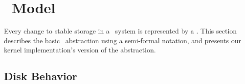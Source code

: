 
\section{\Patch\ Model}
\label{sec:patch}

\makeatletter
\let\emptyset\varnothing
\newcommand{\PBlock}[1]{\ensuremath{B_{#1}}}
\newcommand{\PSetlim}[1]{\def\@next{#1}\ifx\@next\@empty\else_{\@next}\fi}
\newcommand{\PMem}[1][]{\ensuremath{\mathcal{U}\PSetlim{#1}}}
\newcommand{\PInf}[1][]{\ensuremath{\mathcal{F}\PSetlim{#1}}}
\newcommand{\PDisk}[1][]{\ensuremath{\mathcal{C}\PSetlim{#1}}}
\newcommand{\PHard}[1][]{\ensuremath{\textit{\Nrb}\PSetlim{#1}}}
\newcommand{\PSoft}[1][]{\ensuremath{\textit{\Rb}\PSetlim{#1}}}
\newcommand{\PEmpty}[1][]{\ensuremath{\textit{\Noop}\PSetlim{#1}}}
\newcommand{\PDDepset}[1]{\ensuremath{\textit{Dep}_1[#1]}}
\newcommand{\PDepend}{\ensuremath{\leadsto}}
\newcommand{\PDDepend}{\ensuremath{\rightarrow}}
\newcommand{\PDepset}[1]{\ensuremath{\textit{Dep}[#1]}}
\newcommand{\PRDepset}[1]{\ensuremath{\textit{RDep}[#1]}}
\makeatother

Every change to stable storage in a \Kudos\ system is represented by a
\emph{\patch}.
%
This section describes the basic \patch\ abstraction using a semi-formal
 notation, and presents our kernel implementation's version of the
 abstraction.

\begin{comment}
%
%
Each \patch\ $p$ encapsulates four important pieces of information: its
 \emph{block}, its \emph{state}, a set of \emph{direct dependencies}, and
 some \emph{undo data}.
\end{comment}

\subsection{Disk Behavior}

